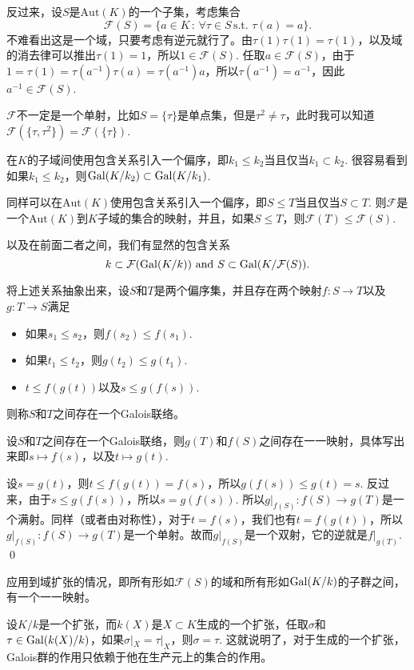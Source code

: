 \para 反过来，设$S$是$\mathrm{Aut}(K)$的一个子集，考虑集合
\[
	\mathcal{F}(S)=\{a\in K\,:\, \forall \tau\in S\,\text{s.t. }\tau(a)=a\}.
\]
不难看出这是一个域，只要考虑有逆元就行了。由$\tau(1)\tau(1)=\tau(1)$，以及域的消去律可以推出$\tau(1)=1$，所以$1\in \mathcal{F}(S)$. 
任取$a\in \mathcal{F}(S)$，由于$1=\tau(1)=\tau(a^{-1})\tau(a)=\tau(a^{-1})a$，所以$\tau(a^{-1})=a^{-1}$，因此$a^{-1}\in \mathcal{F}(S)$.

$\mathcal{F}$不一定是一个单射，比如$S=\{\tau\}$是单点集，但是$\tau^2\neq \tau$，此时我可以知道$\mathcal{F}(\{\tau,\tau^2\})=\mathcal{F}(\{\tau\})$.

\para 在$K$的子域间使用包含关系引入一个偏序，即$k_1\leq k_2$当且仅当$k_1\subset k_2$. 很容易看到如果$k_1\leq k_2$，则$\operatorname{Gal}(K/k_2)\subset \operatorname{Gal}(K/k_1)$. 

同样可以在$\mathrm{Aut}(K)$使用包含关系引入一个偏序，即$S\leq T$当且仅当$S\subset T$. 则$\mathcal{F}$是一个$\mathrm{Aut}(K)$到$K$子域的集合的映射，并且，如果$S\leq T$，则$\mathcal{F}(T)\leq \mathcal{F}(S)$.

以及在前面二者之间，我们有显然的包含关系
\[
	k\subset \mathcal{F}(\operatorname{Gal}(K/k))\text{ and } S\subset \operatorname{Gal}(K/\mathcal{F}(S)).
\]

将上述关系抽象出来，设$S$和$T$是两个偏序集，并且存在两个映射$f:S\to T$以及$g:T\to S$满足
\begin{itemize}
\item 如果$s_1\leq s_2$，则$f(s_2)\leq f(s_1)$.
\item 如果$t_1\leq t_2$，则$g(t_2)\leq g(t_1)$.
\item $t\leq f(g(t))$以及$s\leq g(f(s))$.
\end{itemize}
则称$S$和$T$之间存在一个Galois联络。

\para 设$S$和$T$之间存在一个Galois联络，则$g(T)$和$f(S)$之间存在一一映射，具体写出来即$s\mapsto f(s)$，以及$t \mapsto g(t)$.

\proof 
	设$s=g(t)$，则$t\leq f(g(t))=f(s)$，所以$g(f(s))\leq g(t)=s$. 反过来，由于$s\leq g(f(s))$，所以$s=g(f(s))$. 所以$g|_{f(S)}:f(S)\to g(T)$是一个满射。同样（或者由对称性），对于$t=f(s)$，我们也有$t=f(g(t))$，所以$g|_{f(S)}:f(S)\to g(T)$是一个单射。故而$g|_{f(S)}$是一个双射，它的逆就是$f|_{g(T)}$.
\qed

应用到域扩张的情况，即所有形如$\mathcal{F}(S)$的域和所有形如$\operatorname{Gal}(K/k)$的子群之间，有一个一一映射。

\para 设$K/k$是一个扩张，而$k(X)$是$X\subset K$生成的一个扩张，任取$\sigma$和$\tau\in \operatorname{Gal}(k(X)/k)$，如果$\sigma|_X=\tau|_X$，则$\sigma=\tau$. 这就说明了，对于生成的一个扩张，Galois群的作用只依赖于他在生产元上的集合的作用。

